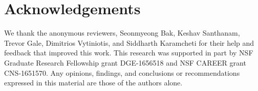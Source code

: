 \section*{Acknowledgements}

We thank the anonymous reviewers, Seonmyeong Bak, Keshav Santhanam, Trevor
Gale, Dimitrios Vytiniotis, and Siddharth Karamcheti for their help and feedback
that improved this work. This research was supported in part by NSF Graduate
Research Fellowship grant DGE-1656518 and NSF CAREER grant CNS-1651570. Any
opinions, findings, and conclusions or recommendations expressed in this material
are those of the authors alone.